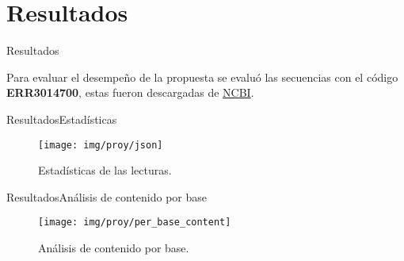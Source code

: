 \documentclass[10pt]{beamer}
\newcommand{\1}{
        	\setbeamertemplate{background}{
        		\texttt{[image: img/1]}
        		\tikz[overlay] \fill[fill opacity=0.75,fill=white] (0,0) rectangle (-\paperwidth,\paperheight);
        	}
}
\begin{document}
\section{Resultados}

\begin{frame}{Resultados}{}
\begin{block}{}
	Para evaluar el desempeño de la propuesta se evaluó las secuencias con el código \textbf{ERR3014700}, estas fueron descargadas de \href{https://www.ncbi.nlm.nih.gov/sra/ERR3014700}{NCBI}. 
\end{block}
\end{frame}

\begin{frame}[fragile]{Resultados}{Estadísticas}
\begin{figure}[]
	\centering
	\texttt{[image: img/proy/json]}
	\caption{Estadísticas de las lecturas.}
\end{figure}
\end{frame}

\begin{frame}{Resultados}{Análisis de contenido por base}
\begin{figure}[]
	\centering
	\texttt{[image: img/proy/per\_base\_content]}
	\caption{Análisis de contenido por base.}
\end{figure}
\end{frame}


\end{document}
